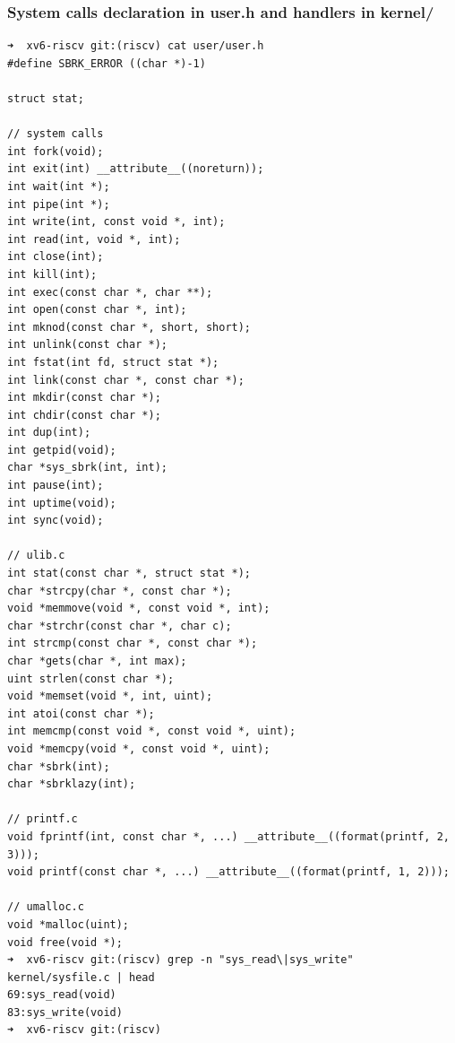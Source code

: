 \documentclass{labreport}
\begin{document}
\subsubsection{System calls declaration in user.h and handlers in kernel/}
\begin{lstlisting}[style=bash]
➜  xv6-riscv git:(riscv) cat user/user.h
#define SBRK_ERROR ((char *)-1)

struct stat;

// system calls
int fork(void);
int exit(int) __attribute__((noreturn));
int wait(int *);
int pipe(int *);
int write(int, const void *, int);
int read(int, void *, int);
int close(int);
int kill(int);
int exec(const char *, char **);
int open(const char *, int);
int mknod(const char *, short, short);
int unlink(const char *);
int fstat(int fd, struct stat *);
int link(const char *, const char *);
int mkdir(const char *);
int chdir(const char *);
int dup(int);
int getpid(void);
char *sys_sbrk(int, int);
int pause(int);
int uptime(void);
int sync(void);

// ulib.c
int stat(const char *, struct stat *);
char *strcpy(char *, const char *);
void *memmove(void *, const void *, int);
char *strchr(const char *, char c);
int strcmp(const char *, const char *);
char *gets(char *, int max);
uint strlen(const char *);
void *memset(void *, int, uint);
int atoi(const char *);
int memcmp(const void *, const void *, uint);
void *memcpy(void *, const void *, uint);
char *sbrk(int);
char *sbrklazy(int);

// printf.c
void fprintf(int, const char *, ...) __attribute__((format(printf, 2, 3)));
void printf(const char *, ...) __attribute__((format(printf, 1, 2)));

// umalloc.c
void *malloc(uint);
void free(void *);
➜  xv6-riscv git:(riscv) grep -n "sys_read\|sys_write" kernel/sysfile.c | head
69:sys_read(void)
83:sys_write(void)
➜  xv6-riscv git:(riscv)
\end{lstlisting}
\end{document}

